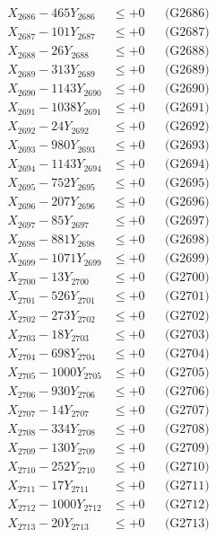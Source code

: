 \documentclass[a4paper,10pt]{article}
\begin{document}
{\begin{align}
X_{2686} - 465Y_{2686} &\leq +0 && \text{(G2686)} \\
X_{2687} - 101Y_{2687} &\leq +0 && \text{(G2687)} \\
X_{2688} - 26Y_{2688} &\leq +0 && \text{(G2688)} \\
X_{2689} - 313Y_{2689} &\leq +0 && \text{(G2689)} \\
X_{2690} - 1143Y_{2690} &\leq +0 && \text{(G2690)} \\
\allowbreak
X_{2691} - 1038Y_{2691} &\leq +0 && \text{(G2691)} \\
X_{2692} - 24Y_{2692} &\leq +0 && \text{(G2692)} \\
X_{2693} - 980Y_{2693} &\leq +0 && \text{(G2693)} \\
X_{2694} - 1143Y_{2694} &\leq +0 && \text{(G2694)} \\
X_{2695} - 752Y_{2695} &\leq +0 && \text{(G2695)} \\
X_{2696} - 207Y_{2696} &\leq +0 && \text{(G2696)} \\
X_{2697} - 85Y_{2697} &\leq +0 && \text{(G2697)} \\
X_{2698} - 881Y_{2698} &\leq +0 && \text{(G2698)} \\
X_{2699} - 1071Y_{2699} &\leq +0 && \text{(G2699)} \\
X_{2700} - 13Y_{2700} &\leq +0 && \text{(G2700)} \\
\allowbreak
X_{2701} - 526Y_{2701} &\leq +0 && \text{(G2701)} \\
X_{2702} - 273Y_{2702} &\leq +0 && \text{(G2702)} \\
X_{2703} - 18Y_{2703} &\leq +0 && \text{(G2703)} \\
X_{2704} - 698Y_{2704} &\leq +0 && \text{(G2704)} \\
X_{2705} - 1000Y_{2705} &\leq +0 && \text{(G2705)} \\
X_{2706} - 930Y_{2706} &\leq +0 && \text{(G2706)} \\
X_{2707} - 14Y_{2707} &\leq +0 && \text{(G2707)} \\
X_{2708} - 334Y_{2708} &\leq +0 && \text{(G2708)} \\
X_{2709} - 130Y_{2709} &\leq +0 && \text{(G2709)} \\
X_{2710} - 252Y_{2710} &\leq +0 && \text{(G2710)} \\
\allowbreak
X_{2711} - 17Y_{2711} &\leq +0 && \text{(G2711)} \\
X_{2712} - 1000Y_{2712} &\leq +0 && \text{(G2712)} \\
X_{2713} - 20Y_{2713} &\leq +0 && \text{(G2713)} \\

\end{align}}
\end{document}
